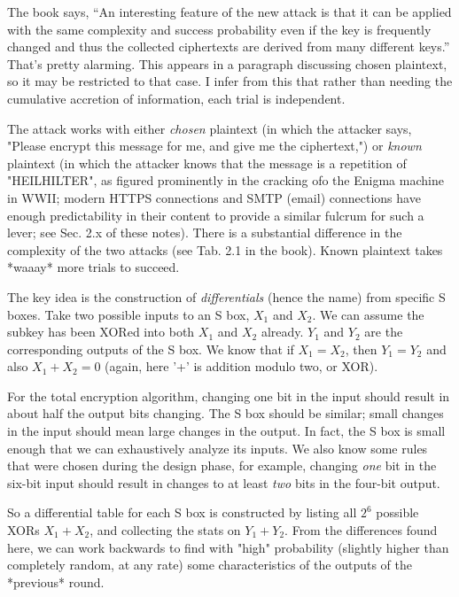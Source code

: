 The book says, ``An interesting feature of the new attack is that it
can be applied with the same complexity and success probability even
if the key is frequently changed and thus the collected ciphertexts
are derived from many different keys.''  \aono{} That's pretty alarming.  This
appears in a paragraph discussing chosen plaintext, so it may be
restricted to that case.  I infer from this that rather than needing
the cumulative accretion of information, each trial is independent.

The attack works with either \emph{chosen} plaintext (in which the attacker
says, "Please encrypt this message for me, and give me the
ciphertext,") or \emph{known} plaintext (in which the attacker knows that
the message is a repetition of "HEILHILTER", as figured prominently in
the cracking ofo the Enigma machine in WWII; modern HTTPS connections and
SMTP (email) connections have enough predictability in their content
to provide a similar fulcrum for such a lever; see Sec. 2.x of these
notes).  There is a substantial difference in the complexity of the
two attacks (see Tab. 2.1 in the book).  Known plaintext takes *waaay*
more trials to succeed.  


The key idea is the construction of \emph{differentials} (hence the name)
from specific S boxes.  Take two possible inputs to an S box, $X_1$
and $X_2$.  We can assume the subkey has been XORed into both $X_1$
and $X_2$ already.  $Y_1$ and $Y_2$ are the corresponding outputs of the
S box.  We know that if $X_1 = X_2$, then $Y_1 = Y_2$ and also $X_1 +
X_2 = 0$ (again, here '+' is addition modulo two, or XOR).

For the total encryption algorithm, changing one bit in the input
should result in about half the output bits changing.  The S box
should be similar; small changes in the input should mean large
changes in the output.  In fact, the S box is small enough that we can
exhaustively analyze its inputs.  We also know some rules that were
chosen during the design phase, for example, changing \emph{one} bit
in the six-bit input should result in changes to at least \emph{two}
bits in the four-bit output.

So a differential table for each S box is constructed by listing all
$2^6$ possible XORs $X_1 + X_2$, and collecting the stats on $Y_1 +
Y_2$.  From the differences found here, we can work backwards to find
with "high" probability (slightly higher than completely random, at
any rate) some characteristics of the outputs of the *previous*
round. 

